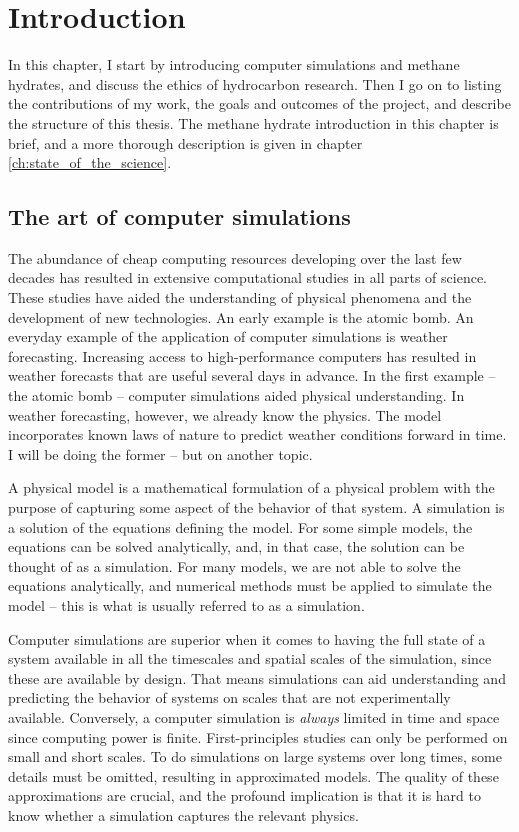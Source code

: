 \chapter{Introduction}
In this chapter, I start by introducing computer simulations and methane hydrates, and discuss the ethics of hydrocarbon research. Then I go on to listing the contributions of my work, the goals and outcomes of the project, and describe the structure of this thesis. The methane hydrate introduction in this chapter is brief, and a more thorough description is given in chapter \ref{ch:state_of_the_science}.

\section{The art of computer simulations}
The abundance of cheap computing resources developing over the last few decades has resulted in extensive computational studies in all parts of science. These studies have aided the understanding of physical phenomena and the development of new technologies. An early example is the atomic bomb. An everyday example of the application of computer simulations is weather forecasting. Increasing access to high-performance computers has resulted in weather forecasts that are useful several days in advance. In the first example -- the atomic bomb -- computer simulations aided physical understanding. In weather forecasting, however, we already know the physics. The model incorporates known laws of nature to predict weather conditions forward in time. I will be doing the former -- but on another topic.

A physical model is a mathematical formulation of a physical problem with the purpose of capturing some aspect of the behavior of that system. A simulation is a solution of the equations defining the model. For some simple models, the equations can be solved analytically, and, in that case, the solution can be thought of as a simulation. For many models, we are not able to solve the equations analytically, and numerical methods must be applied to simulate the model -- this is what is usually referred to as a simulation.

Computer simulations are superior when it comes to having the full state of a system available in all the timescales and spatial scales of the simulation, since these are available by design. That means simulations can aid understanding and predicting the behavior of systems on scales that are not experimentally available. Conversely, a computer simulation is \emph{always} limited in time and space since computing power is finite. First-principles studies can only be performed on small and short scales. To do simulations on large systems over long times, some details must be omitted, resulting in approximated models. The quality of these approximations are crucial, and the profound implication is that it is hard to know whether a simulation captures the relevant physics. 

